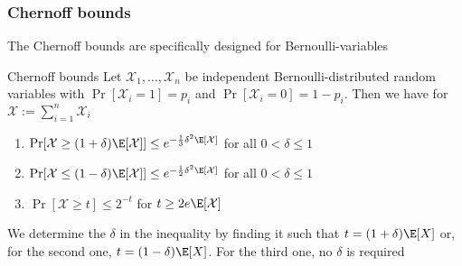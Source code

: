 \subsubsection{Chernoff bounds}
The Chernoff bounds are specifically designed for Bernoulli-variables
\setcounter{all}{70}
\begin{theorem}[]{Chernoff bounds}
    Let $\mathcal{X}_1, \ldots, \mathcal{X}_n$ be independent Bernoulli-distributed random variables with $\Pr[\mathcal{X}_i = 1] = p_i$ and $\Pr[\mathcal{X}_i = 0] = 1 - p_i$. Then we have for $\mathcal{X} := \sum_{i = 1}^{n} \mathcal{X}_i$
    \begin{enumerate}[label=(\roman*)]
        \item $\Pr[\mathcal{X} \geq (1 + \delta)\E[\mathcal{X}]] \leq e^{-\frac{1}{3}\delta^2\E[\mathcal{X}]}$ \largehspace for all $0 < \delta \leq 1$
        \item $\Pr[\mathcal{X} \leq (1 - \delta)\E[\mathcal{X}]] \leq e^{-\frac{1}{2}\delta^2\E[\mathcal{X}]}$ \largehspace for all $0 < \delta \leq 1$
        \item $\Pr[\mathcal{X} \geq t] \leq 2^{-t}$ \largehspace for $t \geq 2e\E[\mathcal{X}]$
    \end{enumerate}
\end{theorem}
We determine the $\delta$ in the inequality by finding it such that $t = (1 + \delta)\E[X]$ or, for the second one, $t = (1 - \delta)\E[X]$. For the third one, no $\delta$ is required
